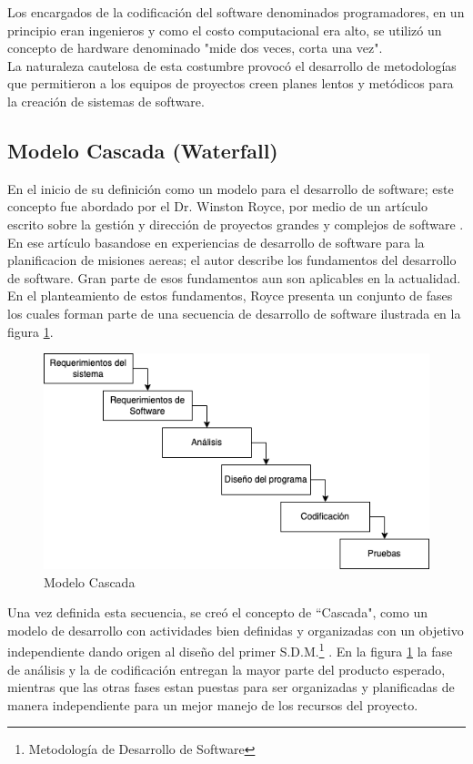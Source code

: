Los encargados de la codificación del software denominados programadores, en un principio eran ingenieros y como el costo computacional era alto, se utilizó un concepto de hardware denominado "mide dos veces, corta una vez"\cite{Ganis}.\\
La naturaleza cautelosa de esta costumbre provocó el desarrollo de metodologías que permitieron a los equipos de proyectos creen planes lentos y metódicos para la creación de sistemas de software.\\

\subsection{Modelo Cascada (Waterfall)}
En el inicio de su definición como un modelo para el desarrollo de software; este concepto fue abordado por el Dr. Winston Royce, por medio de un artículo escrito sobre la gestión y dirección de proyectos grandes y complejos de software \cite{Winston}. En ese artículo basandose en experiencias de desarrollo de software para la planificacion de misiones aereas; el autor describe los fundamentos del desarrollo de software. Gran parte de esos fundamentos aun son aplicables en la actualidad. En el planteamiento de estos fundamentos, Royce presenta un conjunto de fases los cuales forman parte de una secuencia de desarrollo de software ilustrada en la figura \ref{fig:cascada}.

\begin{figure}[H]
    \begin{center}
        \includegraphics[width=12cm]{img/capitulo_2/cascada2.png}
    \end{center}
    \caption{Modelo Cascada}
    \label{fig:cascada}
\end{figure}

Una vez definida esta secuencia, se creó el concepto de ``Cascada", como un modelo de desarrollo con actividades bien definidas y organizadas con un objetivo independiente dando origen al diseño del primer S.D.M.\footnote{Metodología de Desarrollo de Software} \cite{Bell&Thayer}. En la figura \ref{fig:cascada} la fase de análisis y la de codificación entregan la mayor parte del producto esperado, mientras que las otras fases estan puestas para ser organizadas y planificadas de manera independiente para un mejor manejo de los recursos del proyecto.\\

